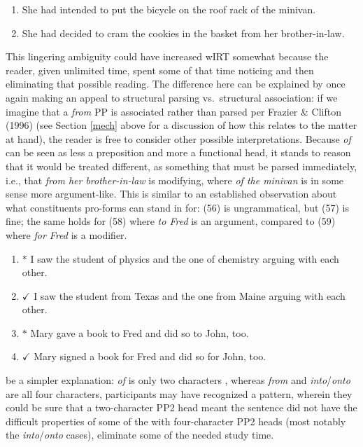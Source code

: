 \documentclass[12pt,oneside]{book}
\providecommand{\tightlist}{%
  \setlength{\itemsep}{0pt}\setlength{\parskip}{0pt}}
\begin{document}
\begin{enumerate}
\def\labelenumi{(\arabic{enumi})}
\setcounter{enumi}{53}
\tightlist
\item
  She had intended to put the bicycle on the roof rack of the minivan.
\item
  She had decided to cram the cookies in the basket from her brother-in-law.
\end{enumerate}

This lingering ambiguity could have increased wIRT somewhat because the reader, given unlimited time,  spent some of that time noticing and then eliminating that possible reading. The difference here can be explained by once again making an appeal to structural parsing vs.~structural association: if we imagine that a \emph{from} PP is associated rather than parsed per Frazier \& Clifton (1996) (see Section \ref{mech} above for a discussion of how this relates to the matter at hand), the reader is free to consider other possible interpretations. Because \emph{of} can be seen as less a preposition and more a functional head, it stands to reason that it would be treated different, as something that must be parsed immediately, i.e., that \emph{from her brother-in-law} is modifying, where \emph{of the minivan} is in some sense more argument-like. This is similar to an established observation about what constituents pro-forms can stand in for: (56) is ungrammatical, but (57) is fine; the same holds for (58) where \emph{to Fred} is an argument, compared to (59) where \emph{for Fred} is a modifier.

\begin{enumerate}
\def\labelenumi{(\arabic{enumi})}
\setcounter{enumi}{55}
\item
  \(*\) I saw the student of physics and the one of chemistry arguing with each other.
\item
  \(\checkmark\) I saw the student from Texas and the one from Maine arguing with each other.
\item
  \(*\) Mary gave a book to Fred and did so to John, too.
\item
  \(\checkmark\) Mary signed a book for Fred and did so for John, too.
\end{enumerate}

 be a simpler explanation:  \emph{of} is only two characters , whereas \emph{from} and \emph{into}/\emph{onto} are all four characters, participants may have recognized a pattern, wherein they could be sure that a two-character PP2 head meant the sentence did not have the difficult properties of some of the  with four-character PP2 heads (most notably the \emph{into}/\emph{onto} cases),  eliminate some of the needed study time.
\end{document}
